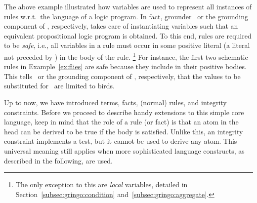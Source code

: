 The above example illustrated how variables are used to represent all instances of
rules w.r.t.\ the language of a logic program.
In fact, grounder \gringo\ or the grounding component of \clingo, respectively,
takes care of instantiating variables
such that an equivalent propositional logic program is obtained.
To this end,
rules are required to be \emph{safe}, 
\label{pg:safe}%
%
i.e.,
all variables in a rule must occur in some positive literal
(a literal not preceded by ) in the body of the rule.%
\footnote{%
The only exception to this are \emph{local} variables, %
detailed in Section~\ref{subsec:gringo:condition} and~\ref{subsec:gringo:aggregate}.} 
For instance, the first two schematic rules in Example~\ref{ex:flies} 
are safe because they include  in their positive bodies.
This tells \gringo\ or the grounding component of \clingo, respectively,
that the values to be substituted for~ are limited to birds.


Up to now, we have introduced terms, facts, (normal) rules, and integrity constraints.
Before we proceed to describe handy extensions to this simple core language,
keep in mind that the role of a rule (or fact) is that an atom in the
head can be derived to be true if the body is satisfied.
Unlike this, an integrity constraint implements a test,
but it cannot be used to derive any atom.
This universal meaning still applies when more sophisticated language constructs,
as described in the following, are used.


